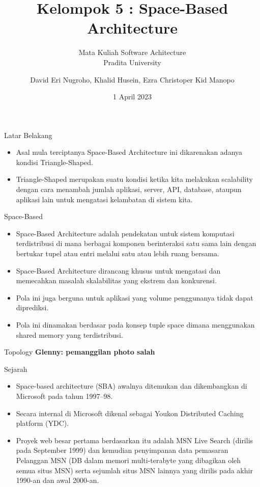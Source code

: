 \documentclass{beamer}
\title{Kelompok 5 : Space-Based Architecture}
\subtitle{Mata Kuliah Software Achitecture\\Pradita University}
\author{David Eri Nugroho, Khalid Husein, Ezra Christoper Kid Manopo}
\date{1 April 2023}
\newcommand{\gny}[2]{{\textbf{\color{blue} Gny: #1}}}
\begin{document}
	
	\begin{frame}[plain]
		\maketitle
	\end{frame}
	
	\begin{frame}{Latar Belakang}
		\begin{itemize}
			\item Asal mula terciptanya Space-Based Architecture ini dikarenakan adanya kondisi Triangle-Shaped.
			\item Triangle-Shaped merupakan suatu kondisi ketika kita melakukan scalability dengan cara menambah jumlah aplikasi, server, API, database, ataupun aplikasi lain untuk mengatasi kelambatan di sistem kita.
		\end{itemize}
	\end{frame}
	
	\begin{frame}{Space-Based}
		\begin{itemize}
			\item Space-Based Architecture adalah pendekatan untuk sistem komputasi terdistribusi di mana berbagai komponen berinteraksi satu sama lain dengan bertukar tupel atau entri melalui satu atau lebih ruang bersama.
			\item Space-Based Architecture dirancang khusus untuk mengatasi dan memecahkan masalah skalabilitas yang ekstrem dan konkurensi.
			\item Pola ini juga berguna untuk aplikasi yang volume penggunanya tidak dapat diprediksi.
			\item Pola ini dinamakan berdasar pada konsep tuple space dimana menggunakan shared memory yang terdistribusi.
		\end{itemize}
	\end{frame}

	\begin{frame}{Topology}
		\centering
	\textbf{\color{blue} Glenny: pemanggilan photo salah}
	\end{frame}

	\begin{frame}{Sejarah}
		\begin{itemize}
			\item Space-based architecture (SBA) awalnya ditemukan dan dikembangkan di Microsoft pada tahun 1997–98.
			\item Secara internal di Microsoft dikenal sebagai Youkon Distributed Caching platform (YDC).
			\item Proyek web besar pertama berdasarkan itu adalah MSN Live Search (dirilis pada September 1999) dan kemudian penyimpanan data pemasaran Pelanggan MSN (DB dalam memori multi-terabyte yang dibagikan oleh semua situs MSN) serta sejumlah situs MSN lainnya yang dirilis pada akhir 1990-an dan awal 2000-an.
		\end{itemize}
	\end{frame}
	
\end{document}

